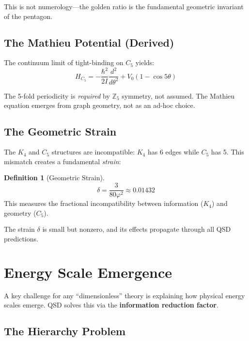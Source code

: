 \documentclass[11pt,a4paper]{article}
\theoremstyle{definition}
\newtheorem{definition}[theorem]{Definition}
\newcommand{\dgeo}{\delta}              %
\begin{document}
This is not numerology---the golden ratio is the fundamental geometric invariant of the pentagon.

\subsection{The Mathieu Potential (Derived)}

The continuum limit of tight-binding on $C_5$ yields:
\begin{equation}
H_{C_5} = -\frac{\hbar^2}{2I}\frac{d^2}{d\theta^2} + V_0(1 - \cos 5\theta)
\label{eq:HC5}
\end{equation}

The 5-fold periodicity is \emph{required} by $\mathbb{Z}_5$ symmetry, not assumed. The Mathieu equation emerges from graph geometry, not as an ad-hoc choice.

\subsection{The Geometric Strain}

The $K_4$ and $C_5$ structures are incompatible: $K_4$ has 6 edges while $C_5$ has 5. This mismatch creates a fundamental \emph{strain}:

\begin{definition}[Geometric Strain]
\begin{equation}
\dgeo = \frac{3}{80\varphi^2} \approx 0.01432
\end{equation}
This measures the fractional incompatibility between information ($K_4$) and geometry ($C_5$).
\end{definition}

The strain $\dgeo$ is small but nonzero, and its effects propagate through all QSD predictions.

\section{Energy Scale Emergence}
\label{sec:scale}

A key challenge for any ``dimensionless'' theory is explaining how physical energy scales emerge. QSD solves this via the \textbf{information reduction factor}.

\subsection{The Hierarchy Problem}
\end{document}
